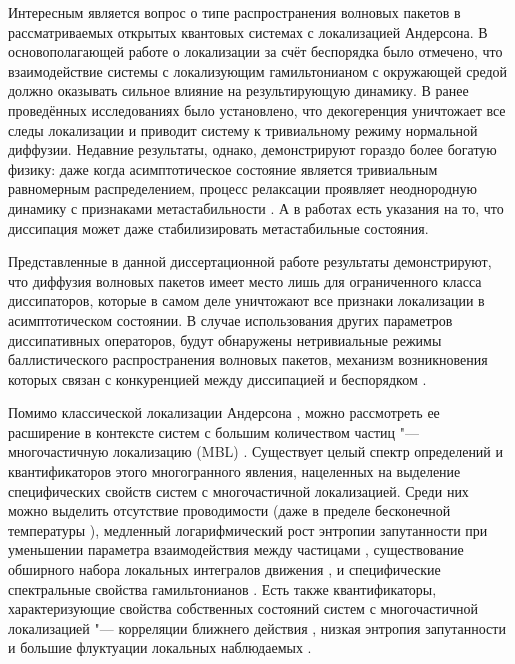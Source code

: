 Интересным является вопрос о типе распространения волновых пакетов в рассматриваемых открытых квантовых системах с локализацией Андерсона.
В основополагающей работе о локализации за счёт беспорядка \autocite{Anderson1958} было отмечено, что взаимодействие системы с локализующим гамильтонианом с окружающей средой должно оказывать сильное влияние на результирующую динамику. 
В ранее проведённых исследованиях \autocite{Gurvitz2000, Nowak2012, Flores1999} было установлено, что декогеренция уничтожает все следы локализации и приводит систему к тривиальному режиму нормальной диффузии.
Недавние результаты, однако, демонстрируют гораздо более богатую физику: даже когда асимптотическое состояние является тривиальным равномерным распределением, процесс релаксации проявляет неоднородную динамику с признаками метастабильности \autocite{Genway2014}. А в работах \autocite{Valenti2015, Spagnolo2015, Spagnolo2016} есть указания на то, что диссипация может даже стабилизировать метастабильные состояния.

Представленные в данной диссертационной работе результаты демонстрируют, что диффузия волновых пакетов имеет место лишь для ограниченного класса диссипаторов, которые в самом деле уничтожают все признаки локализации в асимптотическом состоянии.
В случае использования других параметров диссипативных операторов, будут обнаружены нетривиальные режимы баллистического распространения волновых пакетов, механизм возникновения которых связан с конкуренцией между
диссипацией и беспорядком \cite{Yusipov2018}.

Помимо классической локализации Андерсона \autocite{Anderson1958}, можно рассмотреть ее расширение в контексте систем с большим количеством частиц "--- многочастичную локализацию (MBL) \autocite{Gornyi2005, Basko2006}.
Существует целый спектр определений и квантификаторов этого многогранного явления, нацеленных на выделение специфических свойств систем с многочастичной локализацией.
Среди них можно выделить отсутствие проводимости \autocite{Gornyi2005} (даже в пределе бесконечной температуры \autocite{Basko2006}), медленный логарифмический рост энтропии запутанности при уменьшении параметра взаимодействия между частицами \autocite{Chiara2006, Znidaric2008, Bardarson2012, Serbyn2013_1}, существование обширного набора локальных интегралов движения \autocite{Serbyn2013_2}, и специфические спектральные свойства гамильтонианов \autocite{Oganesyan2007, Serbyn2016}.
Есть также квантификаторы, характеризующие свойства собственных состояний систем с многочастичной локализацией "--- корреляции ближнего действия \autocite{Pal2010}, низкая энтропия запутанности \autocite{Bauer2013, Kjll2014, Khemani2017} и большие флуктуации локальных наблюдаемых \autocite{Bera2015}.

